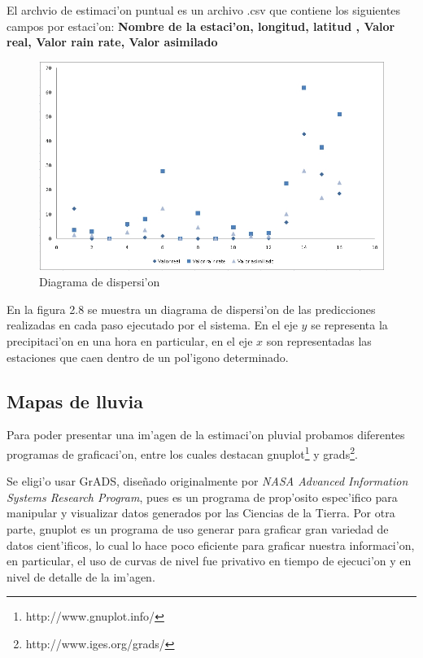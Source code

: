 El archvio de estimaci'on puntual es un archivo .csv que contiene los siguientes campos por estaci'on: 
\textbf{Nombre de la estaci'on, longitud, latitud , Valor real, Valor rain rate, Valor asimilado}


\begin{figure}[h!]
 \centering
 \includegraphics[width=170mm,bb=0 0 837 507]{./imagenes/archivoErrorAnalysis.png}
 \caption{Diagrama de dispersi'on}
\end{figure}

En la figura 2.8 se muestra un diagrama de dispersi'on de las predicciones realizadas en cada paso ejecutado por el sistema.
En el eje ${y}$ se representa la precipitaci'on en una hora en particular, 
en el eje $x$ son representadas las estaciones que caen dentro de un pol'igono
determinado. 


\subsection{Mapas de lluvia}

Para poder presentar una im'agen de la estimaci'on pluvial probamos diferentes programas de graficaci'on, entre los cuales
destacan gnuplot\footnote{http://www.gnuplot.info/} y grads\footnote{http://www.iges.org/grads/}.

Se eligi'o usar GrADS, dise\~nado originalmente por \textit{ NASA Advanced Information Systems Research Program}, 
pues es un programa de prop'osito espec'ifico para manipular y visualizar datos generados por las Ciencias 
de la Tierra. Por otra parte, gnuplot es un programa de uso generar para graficar gran variedad de datos cient'ificos, lo cual
lo hace poco eficiente para graficar nuestra informaci'on, en particular, el uso de curvas de nivel fue privativo en tiempo
de ejecuci'on y en nivel de detalle de la im'agen.

